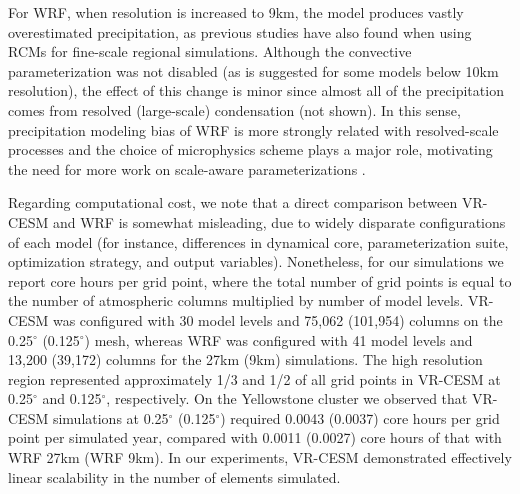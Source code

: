 \documentclass[ms,draft]{agutex}   %
\begin{document}
\begin{article}
For WRF, when resolution is increased to 9km, the model produces vastly overestimated precipitation, as previous studies have also found when using RCMs for fine-scale regional simulations. Although the convective parameterization was not disabled (as is suggested for some models below 10km resolution), the effect of this change is minor since almost all of the precipitation comes from resolved (large-scale) condensation (not shown). In this sense, precipitation modeling bias of WRF is more strongly related with resolved-scale processes and the choice of microphysics scheme plays a major role, motivating the need for more work on scale-aware parameterizations \citep{o2013observed}. 

Regarding computational cost, we note that a direct comparison between VR-CESM and WRF is somewhat misleading, due to widely disparate configurations of each model (for instance, differences in dynamical core, parameterization suite, optimization strategy, and output variables). Nonetheless, for our simulations we report core hours per grid point, where the total number of grid points is equal to the number of atmospheric columns multiplied by number of model levels.  VR-CESM was configured with 30 model levels and 75,062 (101,954) columns on the 0.25$^\circ$ (0.125$^\circ$) mesh, whereas WRF was configured with 41 model levels and 13,200 (39,172) columns for the 27km (9km) simulations.  The high resolution region represented approximately 1/3 and 1/2 of all grid points in VR-CESM at 0.25$^\circ$ and 0.125$^\circ$, respectively.  On the Yellowstone cluster we observed that VR-CESM simulations at 0.25$^\circ$ (0.125$^\circ$) required 0.0043 (0.0037) core hours per grid point per simulated year, compared with 0.0011 (0.0027) core hours of that with WRF 27km (WRF 9km). In our experiments, VR-CESM demonstrated effectively linear scalability in the number of elements simulated.



\end{article}
\end{document}
